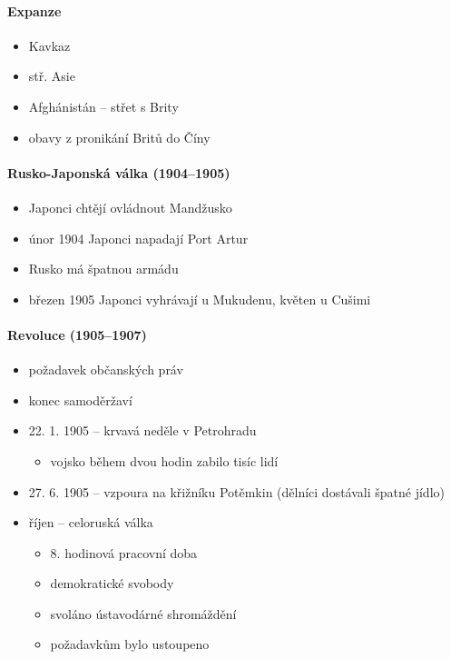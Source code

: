 \paragraph{Expanze}
\begin{itemize}
\item Kavkaz
\item stř. Asie
\item Afghánistán -- střet s Brity
\item obavy z pronikání Britů do Číny
\end{itemize}

\paragraph{Rusko-Japonská válka (1904--1905)}
\begin{itemize}
\item Japonci chtějí ovládnout Mandžusko
\item únor 1904 Japonci napadají Port Artur
\item Rusko má špatnou armádu
\item březen 1905 Japonci vyhrávají u Mukudenu, květen u Cušimi
\end{itemize}

\paragraph{Revoluce (1905--1907)}
\begin{itemize}
\item požadavek občanských práv
\item konec samoděržaví
\item 22. 1. 1905 -- krvavá neděle v Petrohradu
	\begin{itemize}
	\item vojsko během dvou hodin zabilo tisíc lidí
	\end{itemize}
\item 27. 6. 1905 -- vzpoura na křižníku Potěmkin (dělníci dostávali špatné jídlo)
\item říjen -- celoruská válka
	\begin{itemize}
	\item 8. hodinová pracovní doba
	\item demokratické svobody
	\item svoláno ústavodárné shromáždění
	\item požadavkům bylo ustoupeno
	\end{itemize}
\end{itemize}

